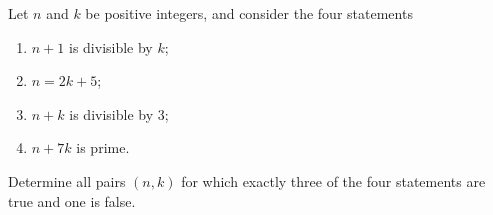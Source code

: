 Let $n$ and $k$ be positive integers, and consider the four statements
\begin{enumerate}
\item[(i)] $n+1$ is divisible by $k$;
\item[(ii)] $n=2k+5$;
\item[(iii)] $n+k$ is divisible by $3$;
\item[(iv)] $n+7k$ is prime.
\end{enumerate}
Determine all pairs $(n,k)$ for which exactly three of the four statements are true and one is false.
